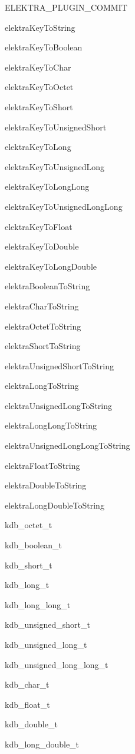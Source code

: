 \begin{DoxyItemize}
\item E\+L\+E\+K\+T\+R\+A\+\_\+\+P\+L\+U\+G\+I\+N\+\_\+\+C\+O\+M\+M\+IT
\item elektra\+Key\+To\+String
\item elektra\+Key\+To\+Boolean
\item elektra\+Key\+To\+Char
\item elektra\+Key\+To\+Octet
\item elektra\+Key\+To\+Short
\item elektra\+Key\+To\+Unsigned\+Short
\item elektra\+Key\+To\+Long
\item elektra\+Key\+To\+Unsigned\+Long
\item elektra\+Key\+To\+Long\+Long
\item elektra\+Key\+To\+Unsigned\+Long\+Long
\item elektra\+Key\+To\+Float
\item elektra\+Key\+To\+Double
\item elektra\+Key\+To\+Long\+Double
\item elektra\+Boolean\+To\+String
\item elektra\+Char\+To\+String
\item elektra\+Octet\+To\+String
\item elektra\+Short\+To\+String
\item elektra\+Unsigned\+Short\+To\+String
\item elektra\+Long\+To\+String
\item elektra\+Unsigned\+Long\+To\+String
\item elektra\+Long\+Long\+To\+String
\item elektra\+Unsigned\+Long\+Long\+To\+String
\item elektra\+Float\+To\+String
\item elektra\+Double\+To\+String
\item elektra\+Long\+Double\+To\+String
\item kdb\+\_\+octet\+\_\+t
\item kdb\+\_\+boolean\+\_\+t
\item kdb\+\_\+short\+\_\+t
\item kdb\+\_\+long\+\_\+t
\item kdb\+\_\+long\+\_\+long\+\_\+t
\item kdb\+\_\+unsigned\+\_\+short\+\_\+t
\item kdb\+\_\+unsigned\+\_\+long\+\_\+t
\item kdb\+\_\+unsigned\+\_\+long\+\_\+long\+\_\+t
\item kdb\+\_\+char\+\_\+t
\item kdb\+\_\+float\+\_\+t
\item kdb\+\_\+double\+\_\+t
\item kdb\+\_\+long\+\_\+double\+\_\+t
\end{DoxyItemize}


